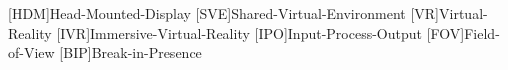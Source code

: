 \begin{acronym}
	[HDM]{Head-Mounted-Display}
	[SVE]{Shared-Virtual-Environment}
	[VR]{Virtual-Reality}
	[IVR]{Immersive-Virtual-Reality}
	[IPO]{Input-Process-Output}
	[FOV]{Field-of-View}
	[BIP]{Break-in-Presence}
\end{acronym}

